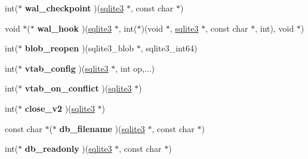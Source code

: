 \begin{DoxyCompactItemize}
\item 
\hypertarget{structsqlite3__api__routines_a8161479d3298a910a21e9d6dd92e1083}{int($\ast$ {\bfseries wal\+\_\+checkpoint} )(\hyperlink{structsqlite3}{sqlite3} $\ast$, const char $\ast$)}\label{structsqlite3__api__routines_a8161479d3298a910a21e9d6dd92e1083}

\item 
\hypertarget{structsqlite3__api__routines_a967b53588e948815d36d870de8da8c60}{void $\ast$($\ast$ {\bfseries wal\+\_\+hook} )(\hyperlink{structsqlite3}{sqlite3} $\ast$, int($\ast$)(void $\ast$, \hyperlink{structsqlite3}{sqlite3} $\ast$, const char $\ast$, int), void $\ast$)}\label{structsqlite3__api__routines_a967b53588e948815d36d870de8da8c60}

\item 
\hypertarget{structsqlite3__api__routines_aa908e25dd18c6a891a767eec620484e5}{int($\ast$ {\bfseries blob\+\_\+reopen} )(sqlite3\+\_\+blob $\ast$, sqlite3\+\_\+int64)}\label{structsqlite3__api__routines_aa908e25dd18c6a891a767eec620484e5}

\item 
\hypertarget{structsqlite3__api__routines_a9670fe7124c3bd00b32354933c15313f}{int($\ast$ {\bfseries vtab\+\_\+config} )(\hyperlink{structsqlite3}{sqlite3} $\ast$, int op,...)}\label{structsqlite3__api__routines_a9670fe7124c3bd00b32354933c15313f}

\item 
\hypertarget{structsqlite3__api__routines_ae153b85e12e894c0bfb433c13c2690d7}{int($\ast$ {\bfseries vtab\+\_\+on\+\_\+conflict} )(\hyperlink{structsqlite3}{sqlite3} $\ast$)}\label{structsqlite3__api__routines_ae153b85e12e894c0bfb433c13c2690d7}

\item 
\hypertarget{structsqlite3__api__routines_a432793b7437f57a622d9bae6172b345b}{int($\ast$ {\bfseries close\+\_\+v2} )(\hyperlink{structsqlite3}{sqlite3} $\ast$)}\label{structsqlite3__api__routines_a432793b7437f57a622d9bae6172b345b}

\item 
\hypertarget{structsqlite3__api__routines_a27e36530f88c1a4af56ec185d4d7ecb0}{const char $\ast$($\ast$ {\bfseries db\+\_\+filename} )(\hyperlink{structsqlite3}{sqlite3} $\ast$, const char $\ast$)}\label{structsqlite3__api__routines_a27e36530f88c1a4af56ec185d4d7ecb0}

\item 
\hypertarget{structsqlite3__api__routines_ad1a3ff6e98715e9d0c9bdf6661dcbfc5}{int($\ast$ {\bfseries db\+\_\+readonly} )(\hyperlink{structsqlite3}{sqlite3} $\ast$, const char $\ast$)}\label{structsqlite3__api__routines_ad1a3ff6e98715e9d0c9bdf6661dcbfc5}


\end{DoxyCompactItemize}
